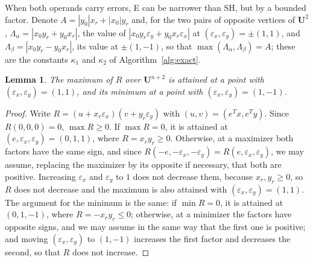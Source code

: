 \documentclass[10pt]{article}
\newtheorem{lemma}{Lemma}
\theoremstyle{definition}
\newcommand{\U}{\mathbf{U}}
\newcommand{\eps}{\varepsilon}
\newcommand{\ex}{\eps_x}
\newcommand{\ey}{\eps_y}
\begin{document}
When both operands carry errors, E can be narrower than SH, but by a bounded factor. Denote $A=|y_0|x_r+|x_0|y_r$ and, for the two pairs of opposite vertices of $\U^2$, $\Lambda_\alpha=|x_0y_r+y_0x_r|$, the value of $|x_0y_r\ey+y_0x_r\ex|$ at $(\ex,\ey)=\pm(1,1)$, and $\Lambda_\beta=|x_0y_r-y_0x_r|$, its value at $\pm(1,-1)$, so that $\max(\Lambda_\alpha,\Lambda_\beta)=A$; these are the constants $\kappa_1$ and $\kappa_2$ of Algorithm~\ref{alg:exact}.

\begin{lemma}
\label{lem:classes}
The maximum of $R$ over $\U^{n+2}$ is attained at a point with $(\ex,\ey)=(1,1)$, and its minimum at a point with $(\ex,\ey)=(1,-1)$.
\end{lemma}
\begin{proof}
Write $R=(u+x_r\ex)(v+y_r\ey)$ with $(u,v)=(e^Tx,e^Ty)$. Since $R(0,0,0)=0$, $\max R\ge0$. If $\max R=0$, it is attained at $(e,\ex,\ey)=(0,1,1)$, where $R=x_ry_r\ge0$. Otherwise, at a maximizer both factors have the same sign, and since $R(-e,-\ex,-\ey)=R(e,\ex,\ey)$, we may assume, replacing the maximizer by its opposite if necessary, that both are positive. Increasing $\ex$ and $\ey$ to $1$ does not decrease them, because $x_r,y_r\ge0$, so $R$ does not decrease and the maximum is also attained with $(\ex,\ey)=(1,1)$. The argument for the minimum is the same: if $\min R=0$, it is attained at $(0,1,-1)$, where $R=-x_ry_r\le0$; otherwise, at a minimizer the factors have opposite signs, and we may assume in the same way that the first one is positive; and moving $(\ex,\ey)$ to $(1,-1)$ increases the first factor and decreases the second, so that $R$ does not increase.
\end{proof}
\end{document}

